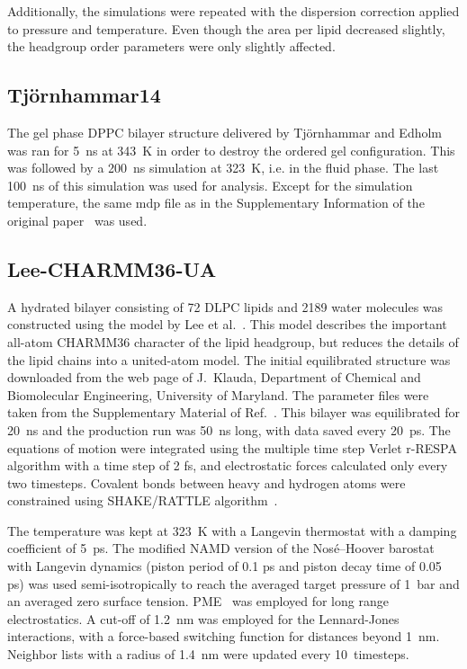 \documentclass[journal=jacsat,manuscript=article]{achemso}
\begin{document}
Additionally, the simulations were repeated with the dispersion correction applied to pressure and temperature. Even though the area per lipid decreased slightly, the headgroup order parameters were only slightly affected.

\subsection{Tj\"ornhammar14}
The gel phase DPPC bilayer structure delivered by Tj\"ornhammar  and Edholm~\cite{tjornhammar14} was ran for 5~ns at 343~K in order to destroy the 
ordered gel configuration. This was followed by a 200~ns simulation at 323~K, i.e. in the fluid phase. The last 100~ns of this simulation was used for analysis. 
Except for the simulation temperature, the same mdp file as in the Supplementary Information of the original paper~\cite{tjornhammar14} was used.

\subsection{Lee-CHARMM36-UA}
A hydrated bilayer consisting of 72 DLPC lipids and 2189 water molecules
 was constructed using the model by Lee et al.~\cite{lee14}. This model describes 
 the important all-atom CHARMM36 character of the lipid headgroup, but 
reduces the details of the lipid chains into a united-atom model.
The initial  equilibrated structure was downloaded from the web page of J.~Klauda, 
Department of Chemical and Biomolecular Engineering, University of Maryland.
 The parameter files were taken from the Supplementary Material of Ref.~.  
This bilayer was equilibrated for 20~ns and the production run was 50~ns long,  with data saved every 20~ps. 
 The equations of motion were integrated using the multiple time step Verlet r-RESPA algorithm with
a time step of 2 fs, and electrostatic forces calculated only every two timesteps.
 Covalent bonds between heavy and hydrogen atoms were constrained 
using SHAKE/RATTLE algorithm~\cite{miyamoto92}.

The temperature was kept at 323~K with a Langevin thermostat
with a damping coefficient of 5~ps.  The modified NAMD version of the
Nos\'{e}--Hoover barostat with Langevin dynamics (piston period of
0.1 ps and piston decay time of 0.05 ps)  was used semi-isotropically 
to reach the averaged target pressure of 1~bar and an averaged zero surface tension.
PME~\cite{darden93,essman95} was employed for long range electrostatics. 
A cut-off of 1.2~nm was employed for  the Lennard-Jones interactions, with 
a force-based switching function  for distances beyond 1~nm.
Neighbor lists with a radius of 1.4~nm were updated every 10~timesteps. 
\end{document}
